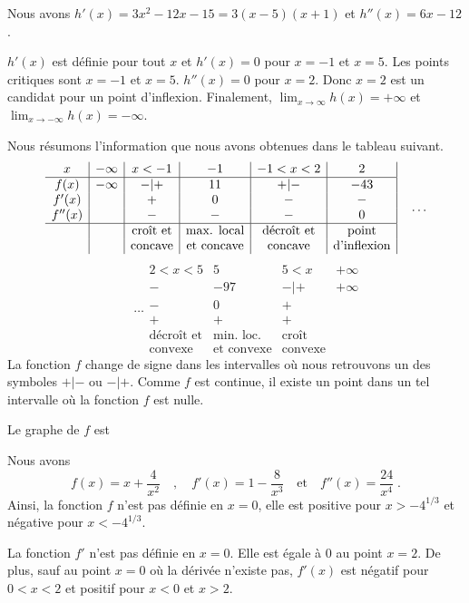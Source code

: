 { Nous avons $\displaystyle h'(x) = 3x^2 -12 x -15 = 3(x-5)(x+1)$ et
$\displaystyle h''(x)=6x-12$.

$h'(x)$ est définie pour tout $x$ et $h'(x) = 0$ pour $x=-1$ et $x=5$.
Les points critiques sont $x=-1$ et $x=5$.  $h''(x) = 0$ pour $x=2$.  Donc
$x=2$ est un candidat pour un point d'inflexion.  Finalement,
$\displaystyle \lim_{x\rightarrow \infty} h(x) = +\infty$ et
$\displaystyle \lim_{x\rightarrow -\infty} h(x) = -\infty$.

Nous résumons l'information que nous avons obtenues dans le tableau suivant.
\[
\begin{array}{c|c|c|c|c|c|}
x & -\infty & x<-1 & -1 & -1<x<2 & 2 \\
\hline
f(x) & -\infty & -|+ & 11 & +|- & -43 \\
f'(x) &  & + & 0 & - & - \\
f''(x) &  & - & - & - & 0 \\
\hline
& & \text{croît et} & \text{max. local} & \text{décroît et} & \text{point} \\
& & \text{concave} & \text{et concave} & \text{concave} & \text{d'inflexion}
\end{array} \quad \ldots
\]
\[
\qquad \ldots \begin{array}{|c|c|c|c}
2<x<5 & 5 & 5<x & +\infty \\
\hline
- & -97 & -|+ & +\infty \\
- & 0 & + & \\
+ & + & + & \\
\hline
\text{décroît et} & \text{min. loc.} & \text{croît} &  \\
\text{convexe} & \text{et convexe} & \text{convexe} &
\end{array}
\]
La fonction $f$ change de signe dans les intervalles où nous retrouvons un des
symboles $+|-$ ou $-|+$.  Comme $f$ est continue, il existe un point dans
un tel intervalle où la fonction $f$ est nulle.

Le graphe de $f$ est

 Nous avons
\[
f(x) = x + \frac{4}{x^2} \quad , \quad
f'(x) = 1 - \frac{8}{x^3} \quad \text{et} \quad f''(x) = \frac{24}{x^4} \; .
\]
Ainsi, la fonction $f$ n'est pas définie en $x=0$, elle est
positive pour $x > -4^{1/3}$ et négative pour $x<-4^{1/3}$.

La fonction $f'$ n'est pas définie en $x=0$.  Elle est égale à $0$ au point
$x=2$.  De plus, sauf au point $x=0$ où la dérivée n'existe pas,
$f'(x)$ est négatif pour $0<x<2$ et positif pour $x<0$ et $x>2$.

}
